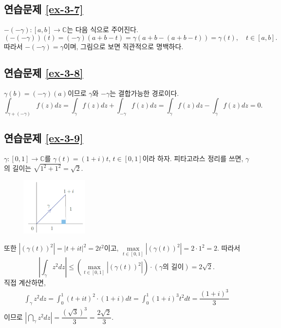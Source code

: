 \subsection*{연습문제 \ref{ex-3-7}}

$-(-\gamma): [a,b] \to \mathbb C$는 다음 식으로 주어진다.
\[
(-(-\gamma))(t)= (-\gamma)(a+b-t) = \gamma(a+b-(a+b-t)) = \gamma(t),
\quad t\in[a,b].
\]
따라서 $-(-\gamma) = \gamma$이며, 그림으로 보면 직관적으로 명백하다.

\subsection*{연습문제 \ref{ex-3-8}}

$\gamma(b) = (-\gamma)(a)$이므로
$\gamma$와 $-\gamma$는 결합가능한 경로이다.
\[
\int_{\gamma+(-\gamma)} f(z) dz = \int_\gamma f(z) dz + \int_{-\gamma} f(z)dz
=  \int_\gamma f(z) dz - \int_\gamma f(z) dz = 0.
\]

\subsection*{연습문제 \ref{ex-3-9}}

$\gamma:[0,1] \to \mathbb C$를 $\gamma(t) = (1+i)t$, $t\in [0,1]$이라 하자.
피타고라스 정리를 쓰면, $\gamma$의 길이는 $\sqrt{1^2+1^2} = \sqrt{2}$.

\begin{figure}[h!]
\begin{center}
\includegraphics[width=0.3\textwidth]{./Solution/figs/fig-s-0-8}
\end{center}
\end{figure}

또한 $|(\gamma(t))^2| = |t+it|^2 = 2t^2$이고,
$\max\limits_{t\in[0,1]} |(\gamma(t))^2| = 2\cdot 1^2 = 2$.
따라서
\[
\left| \int_\gamma z^2dz \right|
\le \left( \max\limits_{t\in[0,1]} |(\gamma(t))^2|  \right) \cdot
(\text{$\gamma$의 길이})
= 2\sqrt{2}.
\]
직접 계산하면,
\begin{align*}
\int_\gamma z^2 dz = \int_0^1 (t+it)^2\cdot(1+i)dt
= \int_0^1 (1+i)^3t^2dt = \dfrac{(1+i)^3}3
\end{align*}
이므로
$\left| \dint_\gamma z^2 dz \right| = \dfrac{(\sqrt{3})^3}3 = \dfrac{2\sqrt{2}}3$.

